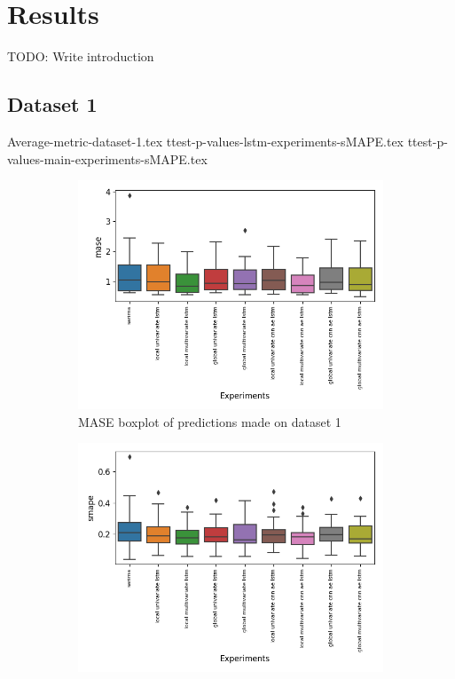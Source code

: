 \section{Results}
\label{section:discussion&results:experiment-results}
TODO: Write introduction
\subsection{Dataset 1}
{Average-metric-dataset-1.tex}
{ttest-p-values-lstm-experiments-sMAPE.tex}
{ttest-p-values-main-experiments-sMAPE.tex}

\begin{figure}[h!]
  \centering
  \begin{subfigure}[b]{0.49\textwidth}
    \includegraphics[width=\textwidth]{./figs/results/boxplot/mase-dataset_1.png}
    \hfill
    \caption{MASE boxplot of predictions made on dataset 1}
    \label{fig:results:boxplot-mase-dataset-1-mase}
  \end{subfigure}
  \begin{subfigure}[b]{0.49\textwidth}
    \includegraphics[width=\textwidth]{./figs/results/boxplot/smape-dataset_1.png}

\end{subfigure}
\end{figure}
